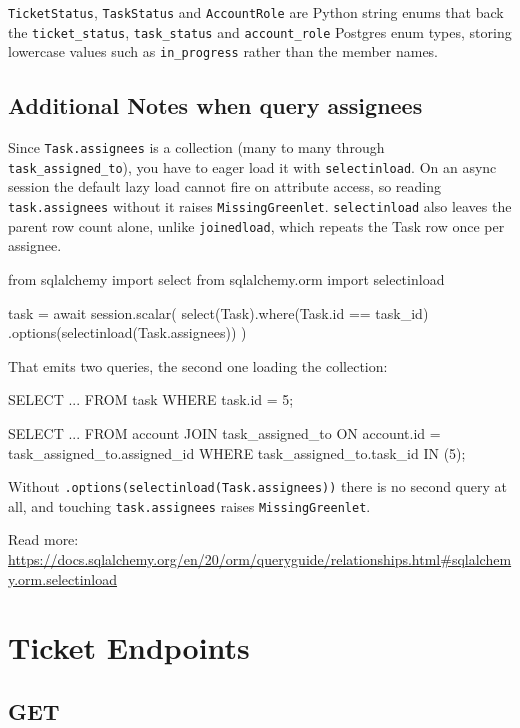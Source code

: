 \documentclass[12pt,letterpaper]{article}
\begin{document}
\texttt{TicketStatus}, \texttt{TaskStatus} and \texttt{AccountRole} are Python
string enums that back the \texttt{ticket\_status}, \texttt{task\_status} and
\texttt{account\_role} Postgres enum types, storing lowercase values such as
\texttt{in\_progress} rather than the member names.

\subsection{Additional Notes when query assignees}

Since \texttt{Task.assignees} is a collection (many to many through
\texttt{task\_assigned\_to}), you have to eager load it with
\texttt{selectinload}. On an async session the default lazy load cannot fire on
attribute access, so reading \texttt{task.assignees} without it raises
\texttt{MissingGreenlet}. \texttt{selectinload} also leaves the parent row count
alone, unlike \texttt{joinedload}, which repeats the Task row once per assignee.

\begin{code}
from sqlalchemy import select
from sqlalchemy.orm import selectinload

task = await session.scalar(
    select(Task).where(Task.id == task_id)
    .options(selectinload(Task.assignees))
)
\end{code}

That emits two queries, the second one loading the collection:

\begin{code}
SELECT ... FROM task WHERE task.id = 5;

SELECT ... FROM account
JOIN task_assigned_to
  ON account.id = task_assigned_to.assigned_id
WHERE task_assigned_to.task_id IN (5);
\end{code}

Without \texttt{.options(selectinload(Task.assignees))} there is no second
query at all, and touching \texttt{task.assignees} raises
\texttt{MissingGreenlet}.

Read more:
\url{https://docs.sqlalchemy.org/en/20/orm/queryguide/relationships.html#sqlalchemy.orm.selectinload}

\section{Ticket Endpoints}

\subsection{GET}
\end{document}
